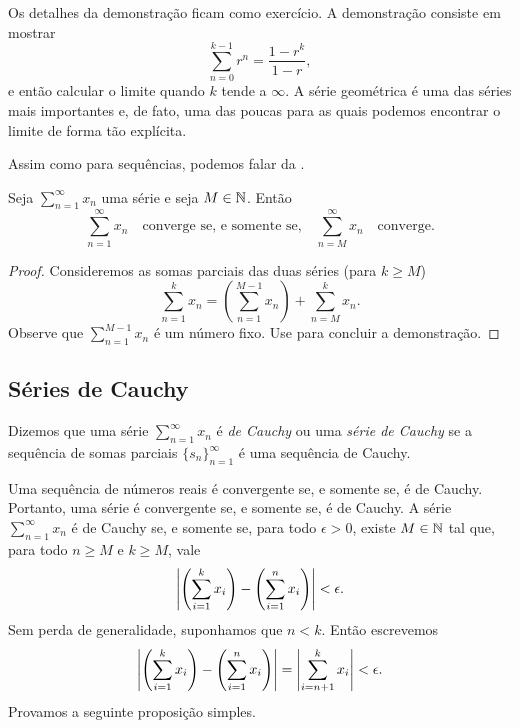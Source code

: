 Os detalhes da demonstração ficam como exercício.
A demonstração consiste em mostrar 
\begin{equation*}
\sum_{n=0}^{k-1} r^n = \frac{1-r^k}{1-r} ,
\end{equation*}
e então calcular o limite quando $k$ tende a $\infty$.
A série geométrica é uma das séries mais importantes e, de fato, uma das poucas
para as quais podemos encontrar o limite de forma tão explícita.

\medskip

\pagebreak[2]
Assim como para sequências, podemos falar da \emph{}.

\begin{prop}
Seja $\sum_{n=1}^\infty x_n$ uma série e seja $M \in {\mathbb{N}}$. Então
\begin{equation*}
\sum_{n=1}^\infty x_n \quad \text{converge se, e somente se,} \quad
\sum_{n=M}^\infty x_n \quad \text{converge.}
\end{equation*}
\end{prop}

\begin{proof}
Consideremos as somas parciais das duas séries (para $k \geq M$)
\begin{equation*}
\sum_{n=1}^{k} x_n
=
\left(
\sum_{n=1}^{M-1} x_n
\right)
+
\sum_{n=M}^{k} x_n .
\end{equation*}
Observe que
$\sum_{n=1}^{M-1} x_n$ é um número fixo. Use
 para concluir a demonstração.
\end{proof}

\subsection{Séries de Cauchy}

\begin{defn}
Dizemos que uma série $\sum_{n=1}^\infty x_n$ é \emph{de Cauchy} ou uma
\emph{série de Cauchy}
se a sequência de somas parciais $\{ s_n \}_{n=1}^\infty$ é uma sequência de Cauchy.
\end{defn}

Uma sequência de números reais é convergente se, e somente se, é
de Cauchy. Portanto, uma série é convergente se, e somente se, é de Cauchy.
A série $\sum_{n=1}^\infty x_n$ é de Cauchy se, e somente se, para todo $\epsilon > 0$,
existe $M \in {\mathbb{N}}$ tal que, para todo $n \geq M$
e $k \geq M$, vale
\begin{equation*}
\left\lvert { \left( \sum_{i=1}^k x_i \right) - \left( \sum_{i=1}^n x_i \right) } \right\rvert
< \epsilon .
\end{equation*}
Sem perda de generalidade, suponhamos que $n < k$. Então escrevemos
\begin{equation*}
\left\lvert { \left( \sum_{i=1}^k x_i \right) - \left( \sum_{i=1}^n x_i \right) } \right\rvert
=
\left\lvert { \sum_{i={n+1}}^k x_i } \right\rvert
< \epsilon .
\end{equation*}
Provamos a seguinte proposição simples.

